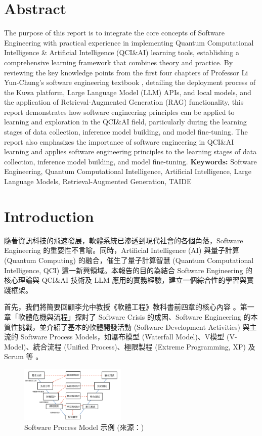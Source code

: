 \documentclass[twocolumn,11pt,a4paper]{article}
\begin{document}
\section*{Abstract}
The purpose of this report is to integrate the core concepts of Software 
Engineering with practical experience in implementing Quantum 
Computational Intelligence \& Artificial Intelligence (QCI\&AI) learning tools, 
establishing a comprehensive learning framework that combines theory and practice. 
By reviewing the key knowledge points from the first four chapters 
of Professor Li Yun-Chung's software engineering textbook
, detailing the deployment process of the Kuwa platform,
Large Language Model (LLM) APIs, and local models, 
and the application of Retrieval-Augmented Generation 
(RAG) functionality, this report demonstrates how  
software engineering principles can be applied to  
learning and exploration in the QCI\&AI field,  
particularly during the learning stages of data collection,  
inference model building, and model fine-tuning.  
The report also emphasizes the importance of software engineering in QCI\&AI learning and applies software engineering principles to the learning stages of data collection, inference model building, and model fine-tuning.
\linebreak \linebreak
\noindent \textbf{Keywords:} Software Engineering, Quantum Computational Intelligence, Artificial Intelligence, Large Language Models, Retrieval-Augmented Generation, TAIDE

\section{Introduction}
隨著資訊科技的飛速發展，軟體系統已滲透到現代社會的各個角落，Software Engineering 的重要性不言喻。同時，Artificial Intelligence (AI) 與量子計算 (Quantum Computing) 的融合，催生了量子計算智慧 (Quantum Computational Intelligence, QCI) 這一新興領域。本報告的目的為結合 Software Engineering 的核心理論與 QCI\&AI 技術及 LLM 應用的實務經驗，建立一個綜合性的學習與實踐框架。

首先，我們將簡要回顧李允中教授《軟體工程》教科書前四章的核心內容 \cite{li2013ch1, li2013ch2, li2013ch3, li2013ch4}。第一章「軟體危機與流程」探討了 Software Crisis 的成因、Software Engineering 的本質性挑戰，並介紹了基本的軟體開發活動 (Software Development Activities) 與主流的 Software Process Models，如瀑布模型 (Waterfall Model)、V模型 (V-Model)、統合流程 (Unified Process)、極限製程 (Extreme Programming, XP) 及 Scrum 等 \cite{li2013ch1}。
\begin{figure}[htbp]
    \centering
    \includegraphics[width=0.45\textwidth]{res/image/v_model.png}
    \caption{Software Process Model 示例 (來源：\cite{li2013ch1})}
    \label{fig:textbook_ch1_fig}
\end{figure}
\FloatBarrier
\end{document}
